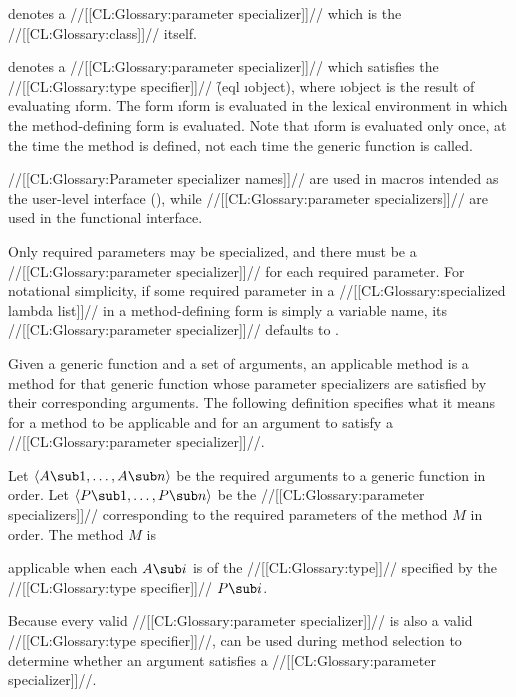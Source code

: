 
denotes a //[[CL:Glossary:parameter specializer]]// which is the //[[CL:Glossary:class]]// itself.


denotes a //[[CL:Glossary:parameter specializer]]// which satisfies the //[[CL:Glossary:type specifier]]// \f{(eql \i{object})}, where \i{object} is the  result of evaluating \i{form}.  The form \i{form} is evaluated in  the lexical environment in which the method-defining form is evaluated. Note that \i{form} is evaluated only once, at the time the method is defined, not each time the generic function is called. \endlist

//[[CL:Glossary:Parameter specializer names]]// are used in macros intended as the user-level interface (), while //[[CL:Glossary:parameter specializers]]// are used in the functional interface.

Only required parameters may be specialized, and there must be a //[[CL:Glossary:parameter specializer]]// for each required parameter.  For notational simplicity, if some required parameter in a //[[CL:Glossary:specialized lambda list]]// in a method-defining form is simply a variable name, its  //[[CL:Glossary:parameter specializer]]// defaults to .

Given a generic function and a set of arguments, an applicable method is a method for that generic function whose parameter specializers are satisfied by their corresponding arguments.  The following definition specifies what it means for a method to be applicable and for an argument to satisfy a //[[CL:Glossary:parameter specializer]]//.

Let $\langle A\sub 1, \ldots, A\sub n\rangle$ be the required arguments to a generic function in order. Let $\langle P\sub 1, \ldots, P\sub n\rangle$ be the //[[CL:Glossary:parameter specializers]]// corresponding to the required parameters of the method $M$ in order.  The method $M$ is

applicable when each $A\sub i$ is of the //[[CL:Glossary:type]]// specified by  the //[[CL:Glossary:type specifier]]// $P\sub i$.

Because every valid //[[CL:Glossary:parameter specializer]]// is  also a valid //[[CL:Glossary:type specifier]]//,  can be used during method selection to determine whether an argument satisfies a //[[CL:Glossary:parameter specializer]]//.  

